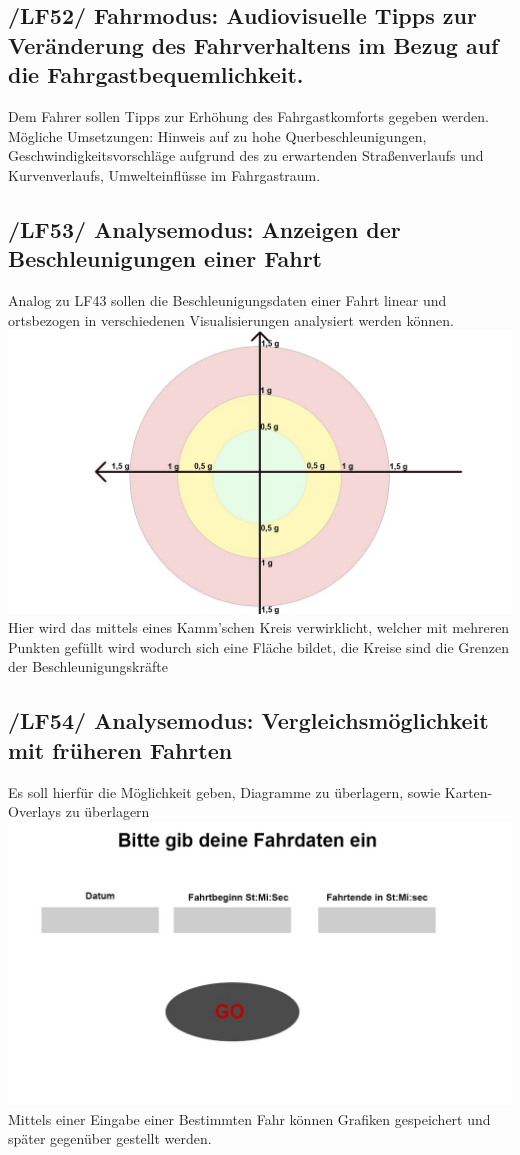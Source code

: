 \subsection{/LF52/ Fahrmodus: Audiovisuelle Tipps zur Veränderung des Fahrverhaltens im Bezug auf die Fahrgastbequemlichkeit.}
\nextline
Dem Fahrer sollen Tipps zur Erhöhung des Fahrgastkomforts gegeben werden. Mögliche Umsetzungen: Hinweis auf zu hohe Querbeschleunigungen, Geschwindigkeitsvorschläge aufgrund des zu erwartenden Straßenverlaufs und Kurvenverlaufs, Umwelteinflüsse im Fahrgastraum.
\nextline
\subsection{/LF53/ Analysemodus: Anzeigen der Beschleunigungen einer Fahrt }
\nextline
Analog zu LF43 sollen die Beschleunigungsdaten einer Fahrt linear und ortsbezogen in verschiedenen Visualisierungen analysiert werden können.
\nextline
 \includegraphics[scale=0.3]{images/LF53_Kalm.jpg}
 \nextline
Hier wird das mittels eines Kamm'schen Kreis verwirklicht, welcher mit mehreren Punkten gefüllt wird wodurch sich eine Fläche bildet, die Kreise sind die Grenzen der Beschleunigungskräfte

\subsection{/LF54/ Analysemodus: Vergleichsmöglichkeit mit früheren Fahrten}
\nextline
Es soll hierfür die Möglichkeit geben, Diagramme zu überlagern, sowie Karten-Overlays zu überlagern 
\nextline
 \includegraphics[scale=0.3]{images/LF54_Fahrdaten.jpg}
 \nextline
Mittels einer Eingabe einer Bestimmten Fahr können Grafiken gespeichert und später gegenüber gestellt werden. 

